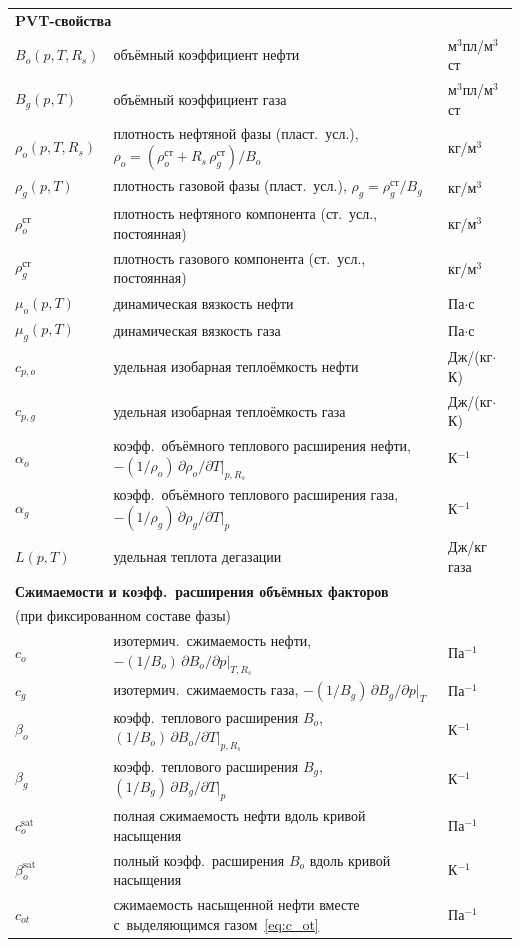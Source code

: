 \documentclass[12pt,a4paper]{article}
\newcommand{\csat}{c_o^{\mathrm{sat}}}
\newcommand{\bsat}{\beta_o^{\mathrm{sat}}}
\begin{document}
\begin{longtable}{lll}
\multicolumn{3}{l}{\textbf{PVT-свойства}} \\
$B_o(p,T,R_s)$ & объёмный коэффициент нефти               & м$^3$пл/м$^3$ст \\
$B_g(p,T)$    & объёмный коэффициент газа                 & м$^3$пл/м$^3$ст \\
$\rho_o(p,T,R_s)$ & плотность нефтяной фазы (пласт.~усл.),
                     $\rho_o = (\rho_o^{\text{ст}} + R_s\,\rho_g^{\text{ст}})/B_o$ & кг/м$^3$ \\
$\rho_g(p,T)$ & плотность газовой фазы (пласт.~усл.),
                $\rho_g = \rho_g^{\text{ст}}/B_g$         & кг/м$^3$ \\
$\rho_o^{\text{ст}}$ & плотность нефтяного компонента (ст.~усл., постоянная) & кг/м$^3$ \\
$\rho_g^{\text{ст}}$ & плотность газового компонента (ст.~усл., постоянная)  & кг/м$^3$ \\
$\mu_o(p,T)$  & динамическая вязкость нефти               & Па$\cdot$с \\
$\mu_g(p,T)$  & динамическая вязкость газа                & Па$\cdot$с \\
$c_{p,o}$     & удельная изобарная теплоёмкость нефти     & Дж/(кг$\cdot$К) \\
$c_{p,g}$     & удельная изобарная теплоёмкость газа      & Дж/(кг$\cdot$К) \\
$\alpha_o$    & коэфф.\ объёмного теплового расширения нефти,
                $-(1/\rho_o)\,\partial\rho_o/\partial T|_{p,R_s}$ & К$^{-1}$ \\
$\alpha_g$    & коэфф.\ объёмного теплового расширения газа,
                $-(1/\rho_g)\,\partial\rho_g/\partial T|_p$ & К$^{-1}$ \\
$L(p,T)$      & удельная теплота дегазации                & Дж/кг газа \\

\multicolumn{3}{l}{\textbf{Сжимаемости и коэфф.\ расширения объёмных факторов}} \\
\multicolumn{3}{l}{\quad\small (при фиксированном составе фазы)} \\
$c_o$         & изотермич.\ сжимаемость нефти, $-(1/B_o)\,\partial B_o/\partial p|_{T,R_s}$ & Па$^{-1}$ \\
$c_g$         & изотермич.\ сжимаемость газа, $-(1/B_g)\,\partial B_g/\partial p|_T$       & Па$^{-1}$ \\
$\beta_o$     & коэфф.\ теплового расширения $B_o$, $(1/B_o)\,\partial B_o/\partial T|_{p,R_s}$ & К$^{-1}$ \\
$\beta_g$     & коэфф.\ теплового расширения $B_g$, $(1/B_g)\,\partial B_g/\partial T|_p$     & К$^{-1}$ \\
$\csat$       & полная сжимаемость нефти вдоль кривой насыщения & Па$^{-1}$ \\
$\bsat$       & полный коэфф.\ расширения $B_o$ вдоль кривой насыщения & К$^{-1}$ \\
$c_{ot}$      & сжимаемость насыщенной нефти вместе с~выделяющимся газом~\eqref{eq:c_ot} & Па$^{-1}$ \\


\end{longtable}
\end{document}
